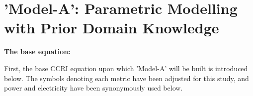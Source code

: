     
    

\section{'Model-A': Parametric Modelling with Prior Domain Knowledge}



\textbf{The base equation:}

First, the base CCRI equation \cite{CryptoCarbonRatingsInstitute2022TheNetwork} upon which 'Model-A' will be built is introduced below. The symbols denoting each metric have been adjusted for this study, and power and electricity have been synonymously used below. 

